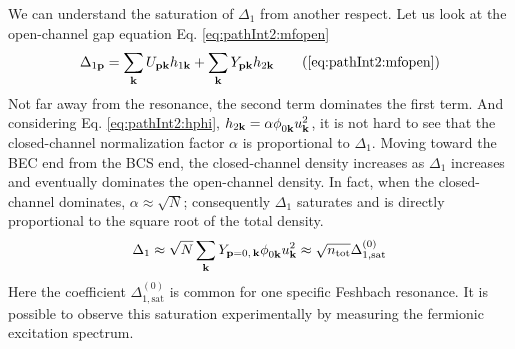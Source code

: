  We can understand the saturation of $\Delta_{1}$ from another respect.  Let us look at the open-channel gap equation Eq. \ref{eq:pathInt2:mfopen} 
\begin{equation}
\Delta_{1\vp}=\sum_{\vk}{}U_{\vp\vk}h_{1\vk}+\sum_{\vk}{}Y_{\vp\vk}h_{2\vk}\tag{\ref{eq:pathInt2:mfopen}}
\end{equation}
Not far away from the resonance, the second term dominates the first term.  And considering Eq. \ref{eq:pathInt2:hphi}, $h_{2\mathbf{k}}=\alpha\phi^{}_{0\mathbf{k}}u_{\mathbf{k}}^{2}$, it is not hard to see that the closed-channel normalization factor $\alpha$ is proportional to $\Delta_1$. Moving toward the BEC end from the BCS end,  the closed-channel density increases as $\Delta_1$ increases and eventually dominates the open-channel density.  In fact,  when the closed-channel dominates, $\alpha\approx\sqrt{N}$; consequently $\Delta_1$ saturates and is directly proportional to the square root of the total density.  
\begin{equation}
\Delta_1\approx\sqrt{N}\sum_{\mathbf{k}}{}Y_{\mathbf{p}=0,\,\mathbf{k}}\phi^{}_{0\mathbf{k}}u_{\mathbf{k}}^{2}\approx{\sqrt{n_{\text{tot}}}\Delta_{1,\text{sat}}^{(0)}}
\end{equation}
Here the coefficient $\Delta_{1,\text{sat}}^{(0)}$ is common for one specific Feshbach resonance.  It is possible to observe this saturation experimentally by measuring the fermionic excitation spectrum.  



